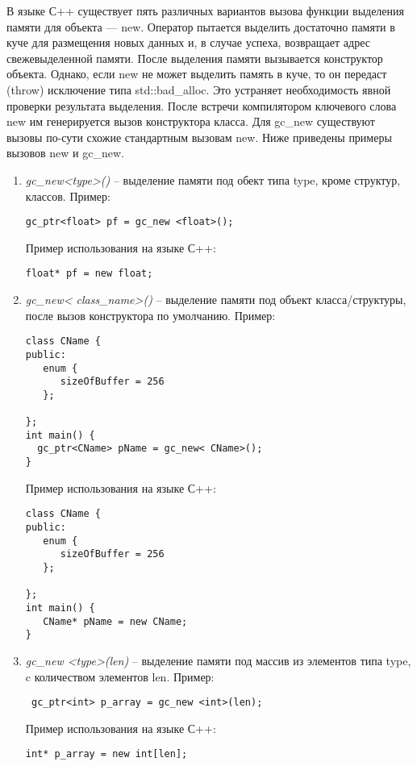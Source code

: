 В языке С++ существует пять различных вариантов вызова функции выделения памяти для объекта --- new. Оператор пытается выделить достаточно памяти в куче для размещения новых данных и, в случае успеха, возвращает адрес свежевыделенной памяти. После выделения памяти вызывается конструктор объекта. Однако, если new не может выделить память в куче, то он передаст (throw) исключение типа std::bad\_alloc. Это устраняет необходимость явной проверки результата выделения. После встречи компилятором ключевого слова new им генерируется вызов конструктора класса.
Для gc\_new существуют вызовы по-сути схожие стандартным вызовам new. Ниже приведены примеры вызовов new и gc\_new.
\begin {enumerate}
\item \textit{gc\_new<type>()} --  выделение памяти под обект типа type, кроме структур, классов. 
Пример:
 \begin{lstlisting}
gc_ptr<float> pf = gc_new <float>();
\end{lstlisting}

Пример использования на языке С++:
\begin{lstlisting}
float* pf = new float;
\end{lstlisting}

\item \textit{gc\_new< class\_name>()} -- выделение памяти под объект класса/структуры, после вызов конструктора по умолчанию. 
Пример:
 \begin{lstlisting}
class CName {
public:
   enum {
      sizeOfBuffer = 256
   };

};
int main() {
  gc_ptr<CName> pName = gc_new< CName>();
}
\end{lstlisting}

Пример использования на языке С++:
\begin{lstlisting}
class CName {
public:
   enum {
      sizeOfBuffer = 256
   };

};
int main() {
   CName* pName = new CName;
}
\end{lstlisting}

\item \textit{gc\_new <type>(len)} -- выделение памяти под массив из элементов типа type, c количеством элементов len. 
Пример:
 \begin{lstlisting}
 gc_ptr<int> p_array = gc_new <int>(len);
\end{lstlisting}
Пример использования на языке С++:

\begin{lstlisting}
int* p_array = new int[len];
\end{lstlisting}


\end{enumerate}
